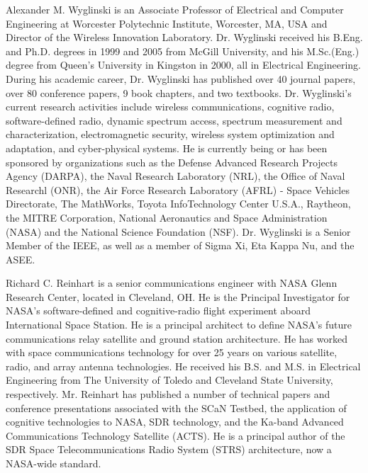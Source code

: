 \documentclass[journal]{IEEEtran}
\begin{document}
\begin{IEEEbiography}{Alexander M. Wyglinski}
is an Associate Professor of Electrical and Computer Engineering at Worcester Polytechnic Institute, Worcester, MA, USA and Director of the Wireless Innovation Laboratory. Dr. Wyglinski received his B.Eng. and Ph.D. degrees in 1999 and 2005 from McGill University, and his M.Sc.(Eng.) degree from Queen’s University in Kingston in 2000, all in Electrical Engineering. During his academic career, Dr. Wyglinski has published over 40 journal papers, over 80 conference papers, 9 book chapters, and two textbooks. Dr. Wyglinski’s current research activities include wireless communications, cognitive radio, software-defined radio, dynamic spectrum access, spectrum measurement and characterization, electromagnetic security, wireless system optimization and adaptation, and cyber-physical systems. He is currently being or has been sponsored by organizations such as the Defense Advanced Research Projects Agency (DARPA), the Naval Research Laboratory (NRL), the Office of Naval Researchl (ONR), the Air Force Research Laboratory (AFRL) - Space Vehicles Directorate, The MathWorks, Toyota InfoTechnology Center U.S.A., Raytheon, the MITRE Corporation, National Aeronautics and Space Administration (NASA) and the National Science Foundation (NSF). Dr. Wyglinski is a Senior Member of the IEEE, as well as a member of Sigma Xi, Eta Kappa Nu, and the ASEE.
\end{IEEEbiography}
\begin{IEEEbiography}{Richard C. Reinhart}
is a senior communications engineer with NASA Glenn Research Center, located in Cleveland, OH. He is the Principal Investigator for NASA's software-defined and cognitive-radio flight experiment aboard International Space Station. He is a principal architect to define NASA's future communications relay satellite and ground station architecture. He has worked with space communications technology for over 25 years on various satellite, radio, and array antenna technologies. He received his B.S. and M.S. in Electrical Engineering from The University of Toledo and Cleveland State University, respectively. Mr. Reinhart has published a number of technical papers and conference presentations associated with the SCaN Testbed, the application of cognitive technologies to NASA, SDR technology, and the Ka-band Advanced Communications Technology Satellite (ACTS). He is a principal author of the SDR Space Telecommunications Radio System (STRS) architecture, now a NASA-wide standard.
\end{IEEEbiography}
\end{document}
